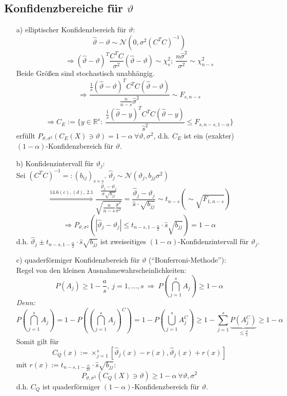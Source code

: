 \documentclass[a4paper,11pt,twoside,titlepage]{article}
\newcommand{\R}{{\mathbb R}}
\newcommand\NN{ \mathcal{N} } %
\begin{document}
\subsection{Konfidenzbereiche für $\vartheta$}
\begin{itemize}
\item[a)] elliptischer Konfidenzbereich für $\vartheta$:
\[\hat\vartheta-\vartheta\sim\NN(0,\sigma^2(C^TC)^{-1})\]
\[\Rightarrow (\hat\vartheta-\vartheta)^T\frac{C^TC}{\sigma^2}(\hat\vartheta-\vartheta)\sim\chi^2_s;\ \frac{n\hat\sigma^2}{\sigma^2}\sim\chi^2_{n-s}\]
Beide Größen sind stochastisch unabhängig.
\[\Rightarrow \frac{\frac1s (\hat\vartheta-\vartheta)^TC^TC(\hat\vartheta-\vartheta)}{\frac{n}{n-s}\hat\sigma^2}\sim F_{s,n-s}\]
\[\Rightarrow C_E:=\{y\in\R^s:\ \frac{\frac1s (\hat\vartheta-y)^TC^TC(\hat\vartheta-y)}{\hat s^2}\leq F_{s,n-s,1-\alpha}\}\]
erfüllt $P_{\vartheta,\sigma^2}(C_E(X)\ni\vartheta)=1-\alpha\ \forall\vartheta,\sigma^2$, d.h. $C_E$ ist ein (exakter) $(1-\alpha)$-Konfidenzbereich für $\vartheta$.
\item[b)] Konfidenzintervall für $\vartheta_j$:\\
Sei $(C^TC)^{-1}=:(b_{ij})_{s\times s}$. $\hat\vartheta_j\sim\NN(\vartheta_j,b_{jj}\sigma^2)$
\[\stackrel{14.6(c),(d),\ 2.1}{\Rightarrow} \frac{\frac{\hat\vartheta_j-\vartheta_j}{\sigma\sqrt{b_{jj}}}}{\sqrt{\frac{n}{n-s}\frac{\hat\sigma^2}{\sigma^2}}}=\frac{\hat\vartheta_j-\vartheta_j}{\hat s\cdot\sqrt{b_{jj}}}\sim t_{n-s}(\sim\sqrt{F_{1,n-s}})\]
\[\Rightarrow P_{\vartheta,\sigma^2}(|\hat\vartheta_j-\vartheta_j|\leq t_{n-s,1-\frac\alpha2}\cdot \hat s\sqrt{b_{jj}})=1-\alpha\]
d.h. $\hat\vartheta_j\pm t_{n-s,1-\frac\alpha2}\cdot \hat s\sqrt{b_{jj}}$ ist zweiseitiges $(1-\alpha)$-Konfidenzintervall für $\vartheta_j$.
\item[c)] quaderförmiger Konfidenzbereich für $\vartheta$ ("`Bonferroni-Methode"'):\\
Regel von den kleinen Ausnahmewahrscheinlichkeiten:
\[P(A_j)\geq 1-\frac as,\ j=1,\ldots,s\ \Rightarrow\ P(\bigcap_{j=1}^s A_j)\geq 1-\alpha\]
\textit{Denn:}
\[P(\bigcap_{j=1}^s A_j)=1-P((\bigcap_{j=1}^s A_j)^C)=1-P(\bigcup_{j=1}^s A_j^C)\geq1-\sum_{j=1}^s\underbrace{P(A_j^C)}_{\leq\frac as}\geq 1-\alpha\]
Somit gilt für 
\[C_Q(x):=\times_{j=1}^s[\hat\vartheta_j(x)-r(x),\hat\vartheta_j(x)+r(x)]\]
mit $r(x):=t_{n-s,1-\frac{\alpha}{2s}}\cdot\hat s\sqrt{b_{jj}}$:
\[P_{\vartheta,\sigma^2}(C_Q(X)\ni\vartheta)\geq1-\alpha\ \forall\vartheta,\sigma^2\]
d.h. $C_Q$ ist quaderförmiger $(1-\alpha)$-Konfidenzbereich für $\vartheta$.


\end{itemize}
\end{document}
